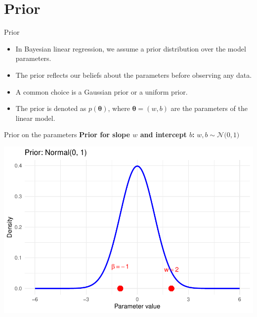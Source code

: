 \documentclass{beamer}
\begin{document}
  \section{Prior}

  \begin{frame}{Prior}
    \begin{itemize}
    \item In Bayesian linear regression, we assume a prior distribution over the model parameters.
    \item The prior reflects our beliefs about the parameters before observing any data.
    \item A common choice is a Gaussian prior or a uniform prior.
    \item The prior is denoted as \(p(\bm{\theta})\), where \(\bm{\theta} = (w, b)\) are the parameters of the linear model.
    \end{itemize}
\end{frame}



\begin{frame}{Prior on the parameters}
  \textbf{Prior for slope \(w\) and intercept \(b\):}
  \(
    w, b \sim \mathcal{N}\big(0, 1\big)
  \)

  \begin{center}
    \includegraphics[width=0.8\linewidth]{prior_1_1.pdf}
  \end{center}
\end{frame}
\end{document}
